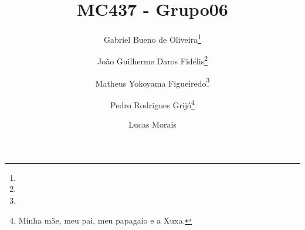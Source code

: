 \documentclass[11pt,twoside]{article}
\begin{document}
% 

%



\TRMakeCover


%
\pagestyle{myheadings}

%
\title{MC437 - Grupo06}

\author{Gabriel Bueno de Oliveira\thanks{} \and
Jo{\~a}o Guilherme Daros Fid{\'e}lis\thanks{} \and
Matheus Yokoyama Figueiredo\thanks{} \and Pedro Rodrigues Grij{\'o}\thanks{Minha m{\~a}e, meu pai, meu papagaio e a Xuxa.} \and Lucas Morais}

\date{}

\maketitle

\end{document}
